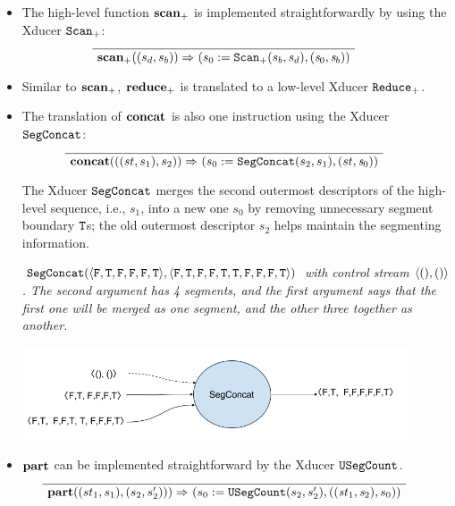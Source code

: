 \begin{itemize}
\item The high-level function $\mathbf{scan}_+$ is implemented straightforwardly by using the  Xducer $\mathtt{Scan}_{+}$:
	$$	\PT{
	\Axiom{\Transf{\*{scan}_+}{(s_d,s_b)}{}{}{\sfun{\sdef{s_0}{\genscan_{+}(s_b,s_d)}} {(\s_0,\s_b)}}}
}$$

\item Similar to $\mathbf{scan}_+$, $\mathbf{reduce}_+$  is translated to a low-level Xducer $\mathtt{Reduce}_{+}$.

\item The translation of $\mathbf{concat}$ is also one instruction using the Xducer $\mathtt{SegConcat}$:
$$	\PT{
	\Axiom{\Transf{\*{concat}}{((st,s_1),s_2)}{}{}{\sfun{\sdef{s_0}{\segconcat(s_2,s_1)}} {(st,\s_0)}}}
}$$


The Xducer $\mathtt{SegConcat}$ merges the second outermost descriptors of the high-level sequence, i.e., $s_1$, into a new one $s_0$ by removing unnecessary segment boundary $\mathtt{T}$s; the old outermost descriptor $s_2$ helps maintain the segmenting information.

\begin{example} \emph{$\segconcat(\<\F,\T,\F,\F,\F,\T\'>,\< \F,\T, \F,\F,\T,\T, \F,\F, \F,\T \'>)$ with control stream $\<(),()\'>$. The second argument has 4 segments, and the first argument says that the first one will be merged as one segment, and the other three together as another.}\\
	\begin{center}
		\includegraphics[width=0.9\textwidth]{fig/segconcat.png}
	\end{center}
\end{example}


\item $\mathbf{part}$ can be implemented straightforward by the Xducer $\mathtt{USegCount}$.
$$	\PT{
	\Axiom{\Transf{\*{part}}{(st_1,s_1),(s_2,s_2'))}{}{}{\sfun{\sdef{s_0}{\usegcount(s_2,s_2')}} {((\st_1,\s_2),s_0)}}}
}$$


\end{itemize}
